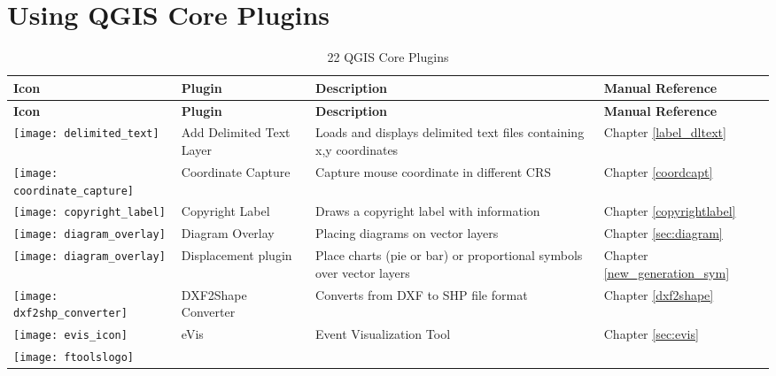 
\chapter{Using QGIS Core Plugins}\label{sec:core_plugins}



{\setlength{\extrarowheight}{15pt}
\small
\begin{longtable}{|p{1.2cm}|p{3.8cm}|p{7.5cm}|p{3cm}|}
\caption{22 QGIS Core Plugins}\label{tab:core_plugins} \\
\hline
 \textbf{Icon} & \textbf{Plugin} & \textbf{Description} & \textbf{Manual Reference}\\
\endfirsthead
\hline
\textbf{Icon} & \textbf{Plugin} & \textbf{Description} & \textbf{Manual Reference}\\
\endhead
\hline
\texttt{[image: delimited\_text]}
 & Add Delimited Text Layer \index{plugins!delimited text} & Loads and displays delimited text files containing x,y coordinates & Chapter \ref{label_dltext}\\
\hline
\texttt{[image: coordinate\_capture]}
 & Coordinate Capture \index{plugins!coordinate capture}& Capture mouse coordinate in different CRS & Chapter \ref{coordcapt}\\
\hline 
\texttt{[image: copyright\_label]}
 & Copyright Label \index{plugins!copyright}& Draws a copyright label with information & Chapter \ref{copyrightlabel}\\
\hline
\texttt{[image: diagram\_overlay]}
 & Diagram Overlay \index{plugins!diagram}& Placing diagrams on vector layers & Chapter \ref{sec:diagram}\\
\hline
\texttt{[image: diagram\_overlay]}
 & Displacement plugin \index{plugins!point displacement}& Place charts (pie or bar) or proportional symbols over vector layers & Chapter \ref{new_generation_sym}\\
\hline
\texttt{[image: dxf2shp\_converter]}
 & DXF2Shape Converter \index{plugins!DXF2Shape}& Converts from DXF to SHP file format & Chapter \ref{dxf2shape}\\
\hline
\texttt{[image: evis\_icon]}
 & eVis & Event Visualization Tool & Chapter \ref{sec:evis}\\
\hline
\texttt{[image: ftoolslogo]}

\end{longtable}}
